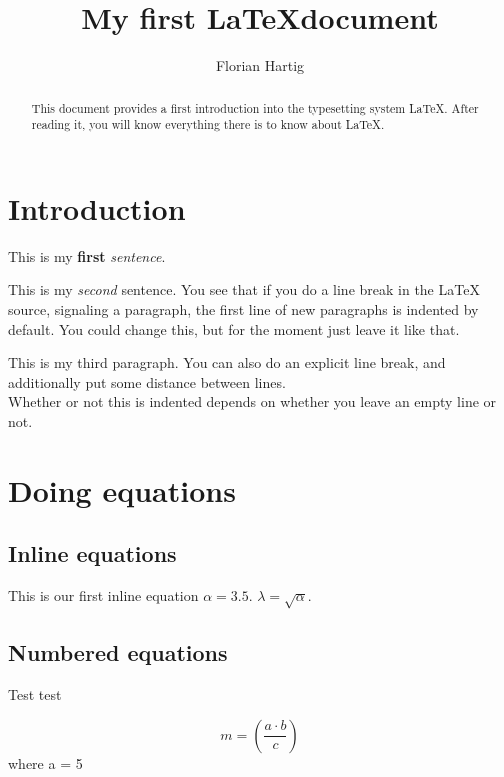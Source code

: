 \documentclass{article}
\author{Florian Hartig}
\title{My first \LaTeX document}
\begin{document}
\maketitle

\begin{abstract}
This document provides a first introduction into the typesetting system \LaTeX . After reading it, you will know everything there is to know about \LaTeX . 
\end{abstract}



\tableofcontents

\section{Introduction}


This is my \textbf{first} \emph{sentence}.

This is my \textit{second} sentence. You see that if you do a line break in the LaTeX source, signaling a paragraph, the first line of new paragraphs is indented by default. You could change this, but for the moment just leave it like that. 

This is my third paragraph. You can also do an explicit line break, and additionally put some distance between lines.\\[7mm]
Whether or not this is indented depends on whether you leave an empty line or not. 


\section{Doing equations}\label{sec: equations}

\subsection{Inline equations}
This is our first inline equation $\alpha = 3.5$. $\lambda = \sqrt{\alpha}$. 

\subsection{Numbered equations}

Test test

\begin{equation}
m = \left( \frac{a \cdot b}{c} \right) 
\end{equation}
%
where a = 5
\end{document}
